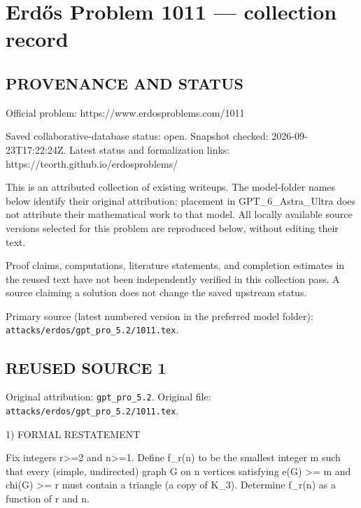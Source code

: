\section*{Erd\H{o}s Problem 1011 --- collection record}

\subsection*{PROVENANCE AND STATUS}
Official problem: https://www.erdosproblems.com/1011

Saved collaborative-database status: open.
Snapshot checked: 2026-09-23T17:22:24Z.
Latest status and formalization links: https://teorth.github.io/erdosproblems/

This is an attributed collection of existing writeups. The model-folder names below identify their original attribution; placement in GPT\_6\_Astra\_Ultra does not attribute their mathematical work to that model. All locally available source versions selected for this problem are reproduced below, without editing their text.

Proof claims, computations, literature statements, and completion estimates in the reused text have not been independently verified in this collection pass. A source claiming a solution does not change the saved upstream status.

Primary source (latest numbered version in the preferred model folder): \texttt{attacks/erdos/gpt\_pro\_5.2/1011.tex}.

\subsection*{REUSED SOURCE 1}
Original attribution: \texttt{gpt\_pro\_5.2}.
Original file: \texttt{attacks/erdos/gpt\_pro\_5.2/1011.tex}.


1) FORMAL RESTATEMENT

Fix integers r>=2 and n>=1. Define f_r(n) to be the smallest integer m such that every (simple, undirected) graph G on n vertices satisfying
  e(G) >= m  and  chi(G) >= r
must contain a triangle (a copy of K_3).
Determine f_r(n) as a function of r and n.

